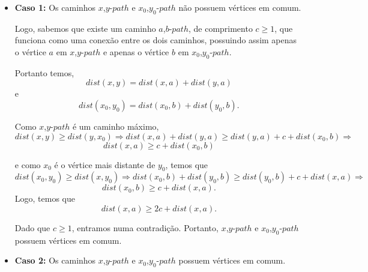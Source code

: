 \documentclass[a4paper,12pt]{article}
\begin{document}
    	\begin{itemize}
            \item \textbf{Caso 1:} Os caminhos $x$,$y$-$path$ e 
            $x_0$,$y_0$-$path$ não possuem vértices em comum.

            Logo, sabemos que existe um caminho $a$,$b$-$path$, 
            de comprimento $c \ge 1$,
            que funciona como uma conexão entre os dois caminhos,
            possuindo assim apenas o vértice $a$ em 
            $x$,$y$-$path$ e apenas o vértice $b$ em
            $x_0$,$y_0$-$path$.

            Portanto temos,
            $$ dist(x,y) = dist(x,a) + dist(y,a) $$ e
            $$ dist(x_0,y_0) = dist(x_0,b) + dist(y_0,b).$$

            Como $x$,$y$-$path$ é um caminho máximo,
            $$ dist(x,y)\ge dist(y,x_0) \Rightarrow 
            dist(x,a)+dist(y,a)\ge dist(y,a)+c+dist(x_0,b)
            \Rightarrow$$
            $$ dist(x,a)\ge c+dist(x_0,b) $$

            e como $x_0$ é o vértice mais distante de $y_0$, 
            temos que 
            $$ dist(x_0,y_0)\ge dist(x,y_0) \Rightarrow 
            dist(x_0,b) + dist(y_0,b)\ge dist(y_0,b) + c + 
            dist(x,a) \Rightarrow $$
            $$ dist(x_0,b)\ge c + dist(x,a). $$ 
            Logo, temos que
            $$ dist(x,a)\ge 2c + dist(x, a). $$

            Dado que $c\ge 1$, entramos numa contradição. 
            Portanto, $x$,$y$-$path$ e $x_0$,$y_0$-$path$
            possuem vértices em comum.


			\bigskip
			\bigskip
			\bigskip

			\item \textbf{Caso 2:} Os caminhos $x$,$y$-$path$ e 
            $x_0$,$y_0$-$path$ possuem vértices em comum.
         	

\end{itemize}
\end{document}
